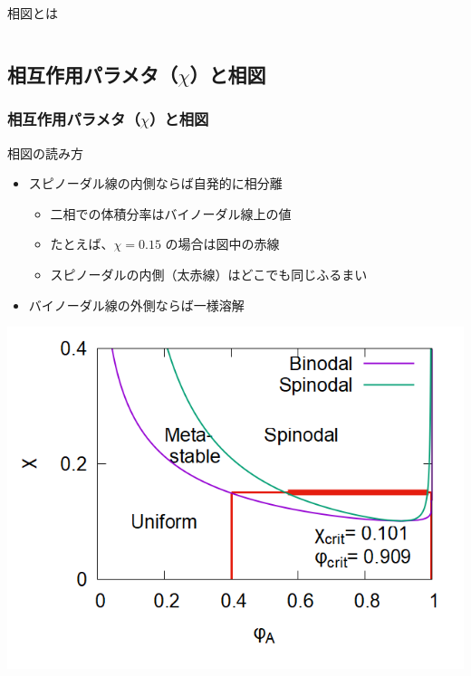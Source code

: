 \documentclass[unicode,12pt]{beamer}%
\begin{document}
\begin{frame}
\begin{columns}[c, onlytextwidth]
\begin{exampleblock}{相図とは}
        \end{exampleblock}
    \end{columns}
\end{frame}

\subsection{相互作用パラメタ（$\chi$）と相図}
\begin{frame}\frametitle{相互作用パラメタ（$\chi$）と相図}
    \begin{block}{相図の読み方}
        \begin{itemize}
            \item スピノーダル線の内側ならば自発的に相分離
            \begin{itemize}
                \item 二相での体積分率はバイノーダル線上の値
                \item たとえば、$\chi=0.15$ の場合は図中の赤線
                \item スピノーダルの内側（太赤線）はどこでも同じふるまい
            \end{itemize}
            \item バイノーダル線の外側ならば一様溶解
        \end{itemize}
        \centering
		\includegraphics[width=.45\textwidth]{PD_6_600_4.png}
    \end{block}
\end{frame}
\end{document}
